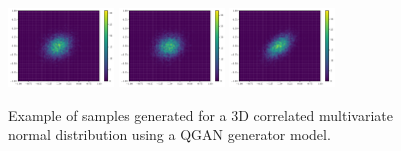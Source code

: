 \documentclass[twocolumn,preprintnumbers,superscriptaddress]{revtex4-2}
\begin{document}
\begin{figure}
  \includegraphics[width=0.25\textwidth]{plots/3Dgaussian_posdef/1-2_FAKE_10000_100_3_5_2_10000_128_0.5.pdf}%
  \includegraphics[width=0.25\textwidth]{plots/3Dgaussian_posdef/2-3_FAKE_10000_100_3_5_2_10000_128_0.5.pdf}%
  \includegraphics[width=0.25\textwidth]{plots/3Dgaussian_posdef/3-1_FAKE_10000_100_3_5_2_10000_128_0.5.pdf}
  \caption{\label{fig:3dgauss}Example of samples generated for a 3D correlated
  multivariate normal distribution using a QGAN generator model.}
\end{figure}
\end{document}
